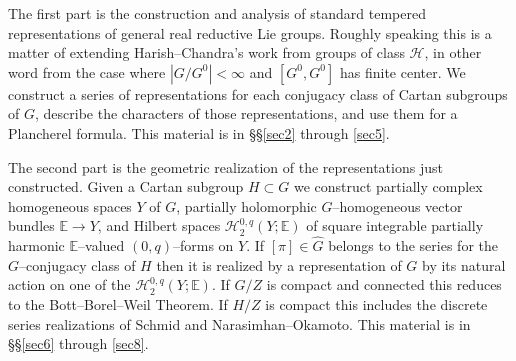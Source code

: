 \documentclass{conm-p-l}
\def\E{\mathbb{E}}
\def\cH{\mathcal{H}}
\begin{document}
The first part is the construction and analysis of standard tempered
representations of general real reductive Lie groups.  Roughly speaking 
this is a matter of extending Harish--Chandra's work from groups of class
$\cH$, in other word from the case where $|G/G^0| < \infty$ and
$[G^0,G^0]$ has finite center.  We construct a series of representations 
for each conjugacy class of Cartan subgroups of $G$, describe the characters 
of those representations, and use them for a Plancherel formula.  This 
material is in \S\S \ref{sec2} through \ref{sec5}.

The second part is the geometric realization of the representations just
constructed.  Given a Cartan subgroup $H \subset G$ we construct partially
complex homogeneous spaces $Y$ of $G$, partially holomorphic $G$--homogeneous
vector bundles $\E \to Y$, and Hilbert spaces $\cH_2^{0,q}(Y;\E)$ of
square integrable partially harmonic $\E$--valued $(0,q)$--forms on $Y$.
If $[\pi] \in \widehat{G}$ belongs to the series for the $G$--conjugacy
class of $H$ then it is realized by a representation of $G$ by its natural
action on one of the $\cH_2^{0,q}(Y;\E)$.  If $G/Z$ is compact and connected
this reduces to the Bott--Borel--Weil Theorem.  If $H/Z$ is compact this
includes the discrete series realizations of Schmid and Narasimhan--Okamoto.
This material is in \S\S \ref{sec6} through \ref{sec8}.
\end{document}
